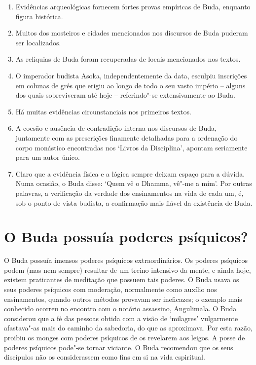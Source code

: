 \begin{enumerate}
\item
  Evidências arqueológicas fornecem fortes provas empíricas de Buda,
  enquanto figura histórica.
\item
  Muitos dos mosteiros e cidades mencionados nos discursos de Buda
  puderam ser localizados.
\item
  As relíquias de Buda foram recuperadas de locais mencionados nos
  textos.
\item
  O imperador budista Asoka, independentemente da data, esculpiu
  inscrições em colunas de grés que erigiu ao longo de todo o seu vasto
  império -- alguns dos quais sobreviveram até hoje -- referindo"-se
  extensivamente ao Buda.
\item
  Há muitas evidências circunstanciais nos primeiros textos.
\item
  A coesão e ausência de contradição interna nos discursos de Buda,
  juntamente com as prescrições finamente detalhadas para a ordenação do
  corpo monástico encontradas nos `Livros da Disciplina', apontam
  seriamente para um autor único.
\item
  Claro que a evidência física e a lógica sempre deixam espaço para a
  dúvida. Numa ocasião, o Buda disse: `Quem vê o Dhamma, vê"-me a mim'.
  Por outras palavras, a verificação da verdade dos ensinamentos na vida
  de cada um, é, sob o ponto de vista budista, a confirmação mais fiável
  da existência de Buda.
\end{enumerate}

\section{O Buda possuía poderes psíquicos?}

O Buda possuía imensos poderes psíquicos extraordinários. Os poderes
psíquicos podem (mas nem sempre) resultar de um treino intensivo da
mente, e ainda hoje, existem praticantes de meditação que possuem tais
poderes. O Buda usava os seus poderes psíquicos com moderação,
normalmente como auxílio nos ensinamentos, quando outros métodos
provavam ser ineficazes; o exemplo mais conhecido ocorreu no encontro
com o notório assassino, Angulimala. O Buda considerou que a fé das
pessoas obtida com a visão de `milagres' vulgarmente afastava"-as mais do
caminho da sabedoria, do que as aproximava. Por esta razão, proibiu os
monges com poderes psíquicos de os revelarem aos leigos. A posse de
poderes psíquicos pode"-se tornar viciante. O Buda recomendou que os seus
discípulos não os considerassem como fins em si na vida espiritual.

